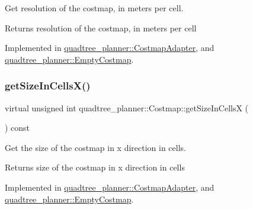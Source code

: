 Get resolution of the costmap, in meters per cell. 

\begin{DoxyReturn}{Returns}
resolution of the costmap, in meters per cell 
\end{DoxyReturn}


Implemented in \hyperlink{classquadtree__planner_1_1CostmapAdapter_abfe3febc6445cbbd2aa7379c8635539b}{quadtree\+\_\+planner\+::\+Costmap\+Adapter}, and \hyperlink{classquadtree__planner_1_1EmptyCostmap_a2401c36e2f5c93fc9ae3dde9fc9ac930}{quadtree\+\_\+planner\+::\+Empty\+Costmap}.

\mbox{\label{classquadtree__planner_1_1Costmap_aa78086776637e7472d5ca8ae44f5c2f0}} 
\subsubsection{\texorpdfstring{get\+Size\+In\+Cells\+X()}{getSizeInCellsX()}}
{\footnotesize\ttfamily virtual unsigned int quadtree\+\_\+planner\+::\+Costmap\+::get\+Size\+In\+CellsX (\begin{DoxyParamCaption}{ }\end{DoxyParamCaption}) const\hspace{0.3cm}{\ttfamily [pure virtual]}}



Get the size of the costmap in x direction in cells. 

\begin{DoxyReturn}{Returns}
size of the costmap in x direction in cells 
\end{DoxyReturn}


Implemented in \hyperlink{classquadtree__planner_1_1CostmapAdapter_a376b9bddbf47474be992170d06e008d7}{quadtree\+\_\+planner\+::\+Costmap\+Adapter}, and \hyperlink{classquadtree__planner_1_1EmptyCostmap_a41621ddd089ca5112d02c1315241534c}{quadtree\+\_\+planner\+::\+Empty\+Costmap}.

\mbox{\label{classquadtree__planner_1_1Costmap_a5c07589004856b158dbbe38470562bfe}} 
